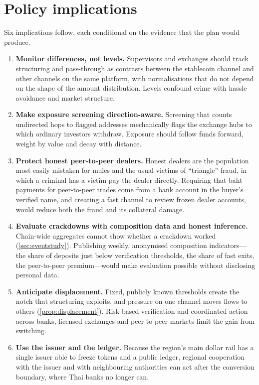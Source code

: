 \section{Policy implications}\label{sec:policy}

Six implications follow, each conditional on the evidence that the plan would produce.

\begin{enumerate}[leftmargin=1.4em,label=\arabic*.]
\item \textbf{Monitor differences, not levels.} Supervisors and exchanges should track structuring and pass-through as
contrasts between the stablecoin channel and other channels on the same platform, with normalisations that do not
depend on the shape of the amount distribution. Levels confound crime with hassle avoidance and market structure.
\item \textbf{Make exposure screening direction-aware.} Screening that counts undirected hops to flagged addresses
mechanically flags the exchange hubs to which ordinary investors withdraw. Exposure should follow funds forward,
weight by value and decay with distance.
\item \textbf{Protect honest peer-to-peer dealers.} Honest dealers are the population most easily mistaken for mules and
the usual victims of ``triangle'' fraud, in which a criminal has a victim pay the dealer directly. Requiring that baht
payments for peer-to-peer trades come from a bank account in the buyer's verified name, and creating a fast channel to
review frozen dealer accounts, would reduce both the fraud and its collateral damage.
\item \textbf{Evaluate crackdowns with composition data and honest inference.} Chain-wide aggregates cannot show whether
a crackdown worked (\cref{sec:eventstudy}). Publishing weekly, anonymised composition indicators---the share of
deposits just below verification thresholds, the share of fast exits, the peer-to-peer premium---would make evaluation
possible without disclosing personal data.
\item \textbf{Anticipate displacement.} Fixed, publicly known thresholds create the notch that structuring exploits, and
pressure on one channel moves flows to others (\cref{prop:displacement}). Risk-based verification and coordinated action
across banks, licensed exchanges and peer-to-peer markets limit the gain from switching.
\item \textbf{Use the issuer and the ledger.} Because the region's main dollar rail has a single issuer able to freeze
tokens and a public ledger, regional cooperation with the issuer and with neighbouring authorities can act after the
conversion boundary, where Thai banks no longer can.
\end{enumerate}

